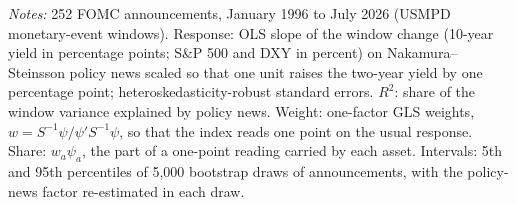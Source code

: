 \begin{table}[tbp]\centering\small
\caption{Policy News, Window Responses and the MCFCI Weights}\label{tab:nvweights}
\begin{flushleft}\footnotesize\textit{Notes:} 252 FOMC announcements, January 1996 to July 2026 (USMPD monetary-event windows). Response: OLS slope of the window change (10-year yield in percentage points; S\&P 500 and DXY in percent) on Nakamura--Steinsson policy news scaled so that one unit raises the two-year yield by one percentage point; heteroskedasticity-robust standard errors. $R^2$: share of the window variance explained by policy news. Weight: one-factor GLS weights, $w=S^{-1}\psi/\psi'S^{-1}\psi$, so that the index reads one point on the usual response. Share: $w_a\psi_a$, the part of a one-point reading carried by each asset. Intervals: 5th and 95th percentiles of 5,000 bootstrap draws of announcements, with the policy-news factor re-estimated in each draw.\end{flushleft}
\end{table}

